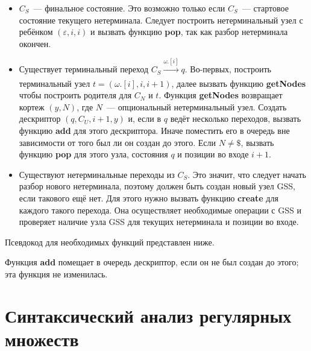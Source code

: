 \begin{itemize} 
	\item $C_S$~--- финальное состояние. Это возможно только если $C_S$~--- стартовое состояние текущего нетерминала. Следует построить нетерминальный
	узел с ребёнком $(\varepsilon, i, i)$ и вызвать функцию \textbf{pop}, так как
	разбор нетерминала окончен.
	
	\item Существует терминальный переход $C_S \xrightarrow[]{\omega.[i]} q$.
	Во-первых, построить терминальный узел $ t = (\omega.[i], i, i+1) $, далее 
	вызвать функцию \textbf{getNodes} чтобы построить родителя для $ C_N $ и $ t $. 
	Функция \textbf{getNodes} возвращает кортеж $ (y, N) $, где $N$~--- опциональный
	нетерминальный узел. Создать дескриптор $ (q, C_U, i+1, y) $ и, если
	в $q$ ведёт несколько переходов, вызвать функцию \textbf{add} для этого дескриптора.
	Иначе поместить его в очередь вне зависимости от того был ли он создан до этого. 
	Если $ N \neq \$$,
	вызвать функцию \textbf{pop} для этого узла, состояния $ q $ и позиции во
	входе $ i + 1 $.
	
	\item Существуют нетерминальные переходы из $C_S$.
	Это значит, что следует начать разбор нового нетерминала, поэтому должен быть
	создан новый узел GSS, если такового ещё нет. Для этого нужно вызвать функцию
	\textbf{create} для каждого такого перехода. Она осуществляет необходимые
	операции с GSS и проверяет наличие узла GSS для текущих нетерминала и 
	позиции во входе.
\end{itemize}
Псевдокод для необходимых функций представлен ниже.

Функция \textbf{add} помещает в очередь дескриптор, если он не был создан до этого; эта функция не изменилась.










\section{Синтаксический анализ регулярных множеств}


